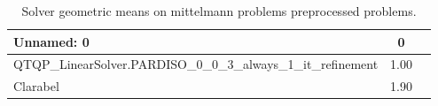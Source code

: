 \begin{table}
\caption{Solver geometric means on mittelmann problems preprocessed problems.}
\label{t-mittelmann problems preprocessed-geom_mean}
\begin{tabular}{lcc}
\toprule
Unnamed: 0 & 0 \\
\midrule
QTQP_LinearSolver.PARDISO_0_0_3_always_1_it_refinement & 1.00 \\
Clarabel & 1.90 \\
\bottomrule
\end{tabular}
\end{table}
